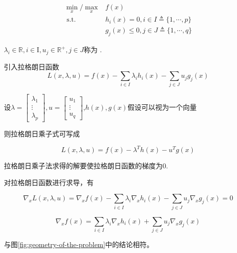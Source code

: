 \begin{definition}
    $$\begin{aligned}
        \min _{x} / \max_{x}& f(x) \\
\text{ s.t. } & h_{i}(x)=0, i \in I \triangleq\{1, \cdots, p\} \\
&g_{j}(x) \leq 0, j \in J \triangleq\{1, \cdots, q\}
    \end{aligned}$$

$ \lambda_{i} \in \mathbb{R}, i \in \mathrm{I}, u_{j} \in \mathbb{R}^{+}, j \in J $称为 .

引入拉格朗日函数 $$ L(x, \lambda, u)=f(x)-\sum_{i \in I} \lambda_{i} h_{i}(x)-\sum_{j \in J} u_{j} g_{j}(x)   $$

设$\lambda=\left[\begin{array}{c}\lambda_{1} \\ \vdots \\ \lambda_{p}\end{array}\right], u=\left[\begin{array}{c}u_{1} \\ \vdots \\ u_{q}\end{array}\right]$,$h(x),g(x)$假设可以视为一个向量

则拉格朗日乘子式可写成


$$ L(x, \lambda, u)=f(x) - \lambda^T h(x) - u^T g(x)$$

拉格朗日乘子法求得的解要使拉格朗日函数的梯度为0.

\end{definition}

\begin{theorem}[拉格朗日函数求导]
    对拉格朗日函数进行求导，有

$$ \nabla_{x} L(x, \lambda, u)=\nabla_{x} f(x)-\sum_{i \in I} \lambda_{i} \nabla_{x} h_{i}(x)-\sum_{j \in J} u_{j} \nabla_{x} g_{j}(x)=0 $$

$$\nabla_{x} f(x)=\sum_{i \in I} \lambda_{i} \nabla_{x} h_{i}(x)+\sum_{j \in J} u_{j} \nabla_{x} g_{j}(x)$$

    与图\ref{fig:geometry-of-the-problem}中的结论相符。
\end{theorem}

